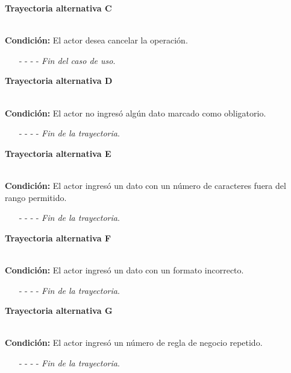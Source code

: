 \hypertarget{CU8-1:TAC}{\textbf{Trayectoria alternativa C}}\\
\noindent \textbf{Condición:} El actor desea cancelar la operación.
\begin{enumerate}
	\UCpaso[\UCactor] Solicita cancelar la operación oprimiendo el botón  de la pantalla 
	\UCpaso[\UCsist] Muestra la pantalla .
	\item[- -] - - {\em {Fin del caso de uso}}.%
\end{enumerate}
\hypertarget{CU8-1:TAD}{\textbf{Trayectoria alternativa D}}\\
\noindent \textbf{Condición:} El actor no ingresó algún dato marcado como obligatorio.
\begin{enumerate}
	\UCpaso[\UCsist] Muestra el mensaje  señalando el campo que presenta el error en la pantalla .
	\UCpaso Regresa al paso \ref{CU8.1-P3} de la trayectoria principal.
	\item[- -] - - {\em {Fin de la trayectoria}}.%
\end{enumerate}
\hypertarget{CU8-1:TAE}{\textbf{Trayectoria alternativa E}}\\
\noindent \textbf{Condición:} El actor ingresó un dato con un número de caracteres fuera del rango permitido.
\begin{enumerate}
	\UCpaso[\UCsist] Muestra el mensaje  señalando el campo que presenta el error en la pantalla .
	\UCpaso Regresa al paso \ref{CU8.1-P3} de la trayectoria principal.
	\item[- -] - - {\em {Fin de la trayectoria}}.%
\end{enumerate}
\hypertarget{CU8-1:TAF}{\textbf{Trayectoria alternativa F}}\\
\noindent \textbf{Condición:} El actor ingresó un dato con un formato incorrecto.
\begin{enumerate}
	\UCpaso[\UCsist] Muestra el mensaje  señalando el campo que presenta el error en la pantalla .
	\UCpaso Regresa al paso \ref{CU8.1-P3} de la trayectoria principal.
	\item[- -] - - {\em {Fin de la trayectoria}}.
\end{enumerate}
\hypertarget{CU8-1:TAG}{\textbf{Trayectoria alternativa G}}\\
\noindent \textbf{Condición:} El actor ingresó un número de regla de negocio repetido.
\begin{enumerate}
	\UCpaso[\UCsist] Muestra el mensaje  señalando el campo que presenta la duplicidad en la pantalla .
	\UCpaso Regresa al paso \ref{CU8.1-P3} de la trayectoria principal.
	\item[- -] - - {\em {Fin de la trayectoria}}.
\end{enumerate}

